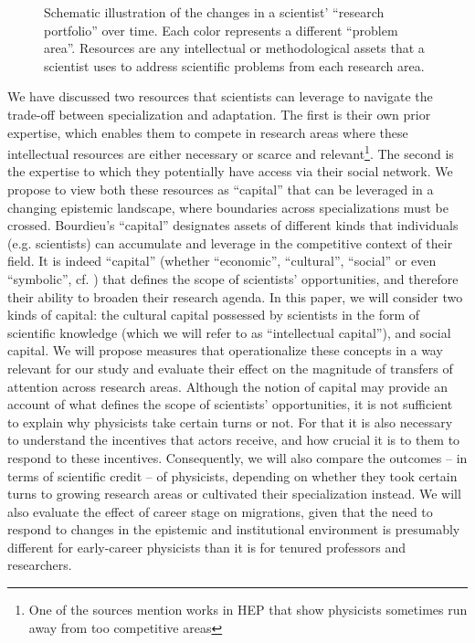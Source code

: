 \documentclass{article}
\begin{document}
\begin{figure}
\begin{tikzpicture}
    
    \end{tikzpicture} 

    \caption{Schematic illustration of the changes in a scientist' ``research portfolio'' over time. Each color represents a different ``problem area''. Resources are any intellectual or methodological assets that a scientist uses to address scientific problems from each research area.}
    \label{fig:research-agenda}
\end{figure}


We have discussed two resources that scientists can leverage to navigate the trade-off between specialization and adaptation. The first is their own prior expertise, which enables them to compete in research areas where these intellectual resources are either necessary or scarce and relevant\footnote{One of the sources mention works in HEP that show physicists sometimes run away from too competitive areas}. The second is the expertise to which they potentially have access via their social network. We propose to view both these resources as ``capital'' \citep{Bourdieu1986} that can be leveraged in a changing epistemic landscape, where boundaries across specializations must be crossed. Bourdieu's ``capital'' designates assets of different kinds that individuals (e.g. scientists) can accumulate and leverage in the competitive context of their field. It is indeed ``capital''  (whether ``economic'', ``cultural'', ``social'' or even ``symbolic'', cf. \citealt{Bourdieu1986}) that defines the scope of scientists' opportunities, and therefore their ability to broaden their research agenda. In this paper, we will consider two kinds of capital: the cultural capital possessed by scientists in the form of scientific knowledge (which we will refer to as ``intellectual capital''), and social capital. We will propose measures that operationalize these concepts in a way relevant for our study and evaluate their effect on the magnitude of transfers of attention across research areas. Although the notion of capital may provide an account of what defines the scope of scientists' opportunities, it is not sufficient to explain why physicists take certain turns or not. For that it is also necessary to understand the incentives that actors receive, and how crucial it is to them to respond to these incentives. Consequently, we will also compare the outcomes -- in terms of scientific credit -- of physicists, depending on whether they took certain turns to growing research areas or cultivated their specialization instead. We will also evaluate the effect of career stage on migrations, given that the need to respond to changes in the epistemic and institutional environment is presumably different for early-career physicists than it is for tenured professors and researchers.
\end{document}
